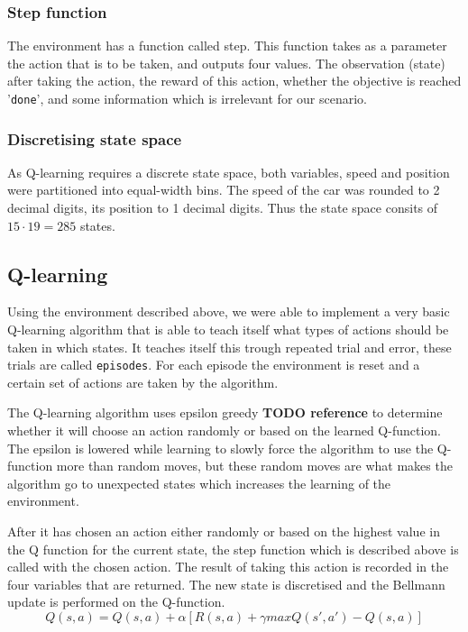 \documentclass{article}
\begin{document}
\subsubsection{Step function}
The environment has a function called step. This function takes as a parameter the action that is to be taken, and outputs four values. The observation (state) after taking the action, the reward of this action, whether the objective is reached '\texttt{done}', and some information which is irrelevant for our scenario. 

\subsubsection{Discretising state space}
As Q-learning requires a discrete state space, both variables, speed and position were partitioned into equal-width bins. The speed of the car was rounded to 2 decimal digits, its position to 1 decimal digits. Thus the state space consits of $15 \cdot 19 = 285$ states.

\subsection{Q-learning}
Using the environment described above, we were able to implement a very basic Q-learning algorithm that is able to teach itself what types of actions should be taken in which states. 
It teaches itself this trough repeated trial and error, these trials are called \texttt{episodes}. For each episode the environment is reset and a certain set of actions are taken by the algorithm. 

The Q-learning algorithm uses epsilon greedy \textbf{TODO reference} to determine whether it will choose an action randomly or based on the learned Q-function. The epsilon is lowered while learning to slowly force the algorithm to use the Q-function more than random moves, but these random moves are what makes the algorithm go to unexpected states which increases the learning of the environment. 

After it has chosen an action either randomly or based on the highest value in the Q function for the current state, the step function which is described above is called with the chosen action. The result of taking this action is recorded in the four variables that are returned. The new state is discretised and the Bellmann update is performed on the Q-function. 
\begin{displaymath}
  Q(s, a) = Q(s,a) + \alpha[R(s,a) + \gamma max Q(s', a') - Q(s, a)]
\end{displaymath}
\end{document}

